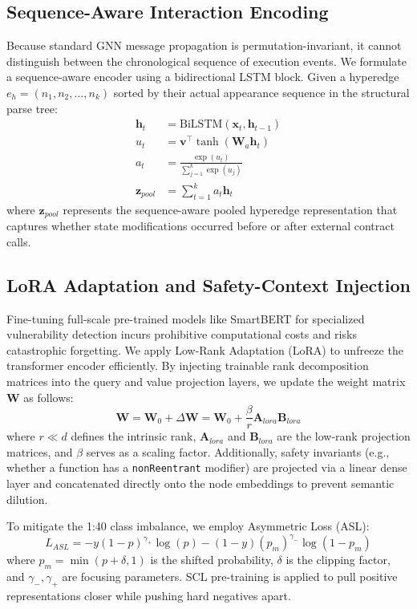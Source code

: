 \documentclass[conference]{IEEEtran}
\begin{document}
\subsection{Sequence-Aware Interaction Encoding}
Because standard GNN message propagation is permutation-invariant, it cannot distinguish between the chronological sequence of execution events. We formulate a sequence-aware encoder using a bidirectional LSTM block. Given a hyperedge $e_h=(n_1,n_2,\dots,n_k)$ sorted by their actual appearance sequence in the structural parse tree:
\begin{align}
\mathbf{h}_t&=\text{BiLSTM}(\mathbf{x}_t,\mathbf{h}_{t-1}) \\
u_t&=\mathbf{v}^\top\tanh(\mathbf{W}_a\mathbf{h}_t) \\
a_t&=\frac{\exp(u_t)}{\sum_{j=1}^k\exp(u_j)} \\
\mathbf{z}_{pool}&=\sum_{t=1}^k a_t\mathbf{h}_t
\end{align}
where $\mathbf{z}_{pool}$ represents the sequence-aware pooled hyperedge representation that captures whether state modifications occurred before or after external contract calls.

\subsection{LoRA Adaptation and Safety-Context Injection}
Fine-tuning full-scale pre-trained models like SmartBERT for specialized vulnerability detection incurs prohibitive computational costs and risks catastrophic forgetting. We apply Low-Rank Adaptation (LoRA) to unfreeze the transformer encoder efficiently. By injecting trainable rank decomposition matrices into the query and value projection layers, we update the weight matrix $\mathbf{W}$ as follows:
$$ \mathbf{W}=\mathbf{W}_0+\Delta\mathbf{W}=\mathbf{W}_0+\frac{\beta}{r}\mathbf{A}_{lora}\mathbf{B}_{lora} $$
where $r\ll d$ defines the intrinsic rank, $\mathbf{A}_{lora}$ and $\mathbf{B}_{lora}$ are the low-rank projection matrices, and $\beta$ serves as a scaling factor. Additionally, safety invariants (e.g., whether a function has a \texttt{nonReentrant} modifier) are projected via a linear dense layer and concatenated directly onto the node embeddings to prevent semantic dilution.

To mitigate the 1:40 class imbalance, we employ Asymmetric Loss (ASL):
$$ L_{ASL}=-y(1-p)^{\gamma_+}\log(p)-(1-y)(p_m)^{\gamma_-}\log(1-p_m) $$
where $p_m=\min(p+\delta,1)$ is the shifted probability, $\delta$ is the clipping factor, and $\gamma_-,\gamma_+$ are focusing parameters. SCL pre-training is applied to pull positive representations closer while pushing hard negatives apart.
\end{document}
